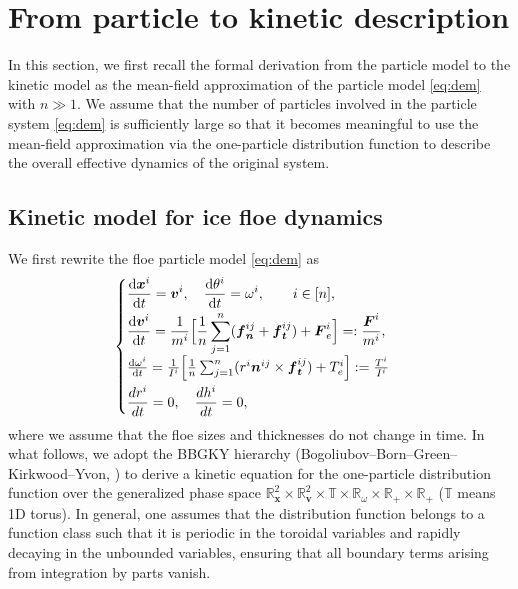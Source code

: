 \documentclass[a4paper,11pt]{article}
\numberwithin{equation}{section}
\theoremstyle{definition}
\newcommand{\bfx}{\boldsymbol{x}}
\newcommand{\bfv}{\boldsymbol{v}}
\newcommand{\bfn}{\boldsymbol{n}}
\newcommand{\bft}{\boldsymbol{t}}
\newcommand{\bff}{\boldsymbol{f}}
\newcommand{\bfF}{\boldsymbol{F}}
\newcommand{\bbr}{\mathbb R}
\def\d{{  \rm d}}
\begin{document}
\section{From particle to kinetic description} \label{sec:kmodel}
In this section, we first recall the formal derivation from the particle model to the kinetic model as the mean-field approximation of the particle model \eqref{eq:dem} with $n \gg 1$. 
We assume that the number of particles involved in the particle system \eqref{eq:dem} is sufficiently large so that it becomes meaningful to use the mean-field approximation via the one-particle distribution function to describe the overall effective dynamics of the original system.  


\subsection{Kinetic model for ice floe dynamics}
We first rewrite the floe particle model \eqref{eq:dem} as 
%
\begin{equation}
\begin{cases} \label{eq:dem2}
 \displaystyle \frac{\d\bfx^i}{\d t} = \bfv^i, \quad \frac{\d\theta^i}{\d t}  = \omega^i, \qquad i \in [n], \\[0.2cm]
 \displaystyle \frac{\d\bfv^i}{\d t} = \frac{1}{m^i} \Big[  \frac{1}{n} \sum_{j=1}^{n} (\bff_{\bfn}^{ij} + \bff_{\bft}^{ij})  + \bfF^i_e \Big] =: \frac{\bfF^i}{m^i}, \\[0.2cm]
   \frac{\d\omega^i}{\d t} = \frac{1}{I^i} \Big[ \frac{1}{n} \sum_{j=1}^{n} ( r^i\bfn^{ij}\times \bff_{\bft}^{ij})  + T^i_e \Big]
  := \frac{T^i}{I^i} \\[0.2cm]
 \displaystyle \frac{dr^i}{dt} = 0, \quad \frac{dh^i}{dt} = 0,
\end{cases} 
\end{equation}
where we assume that the floe sizes and thicknesses do not change in time. In what follows, we adopt the BBGKY hierarchy (Bogoliubov–Born–Green–Kirkwood–Yvon, \cite{Bogoliubov1946,bogoliubov1946kinetic,born1946general,kirkwood1946statistical,yvon1935theorie}) to derive a kinetic equation for the one-particle distribution function over the generalized phase space $\bbr_{\bfx}^2 \times \bbr_{\bfv}^2 \times \mathbb{T} \times \bbr_{\omega} \times \bbr_+ \times \bbr_+$ ($\mathbb{T}$ means 1D torus). 
In general, one assumes that the distribution function belongs to a function class such that it is periodic in the toroidal variables and rapidly decaying in the unbounded variables, ensuring that all boundary terms arising from integration by parts vanish.
\end{document}
